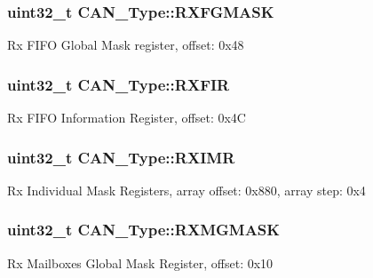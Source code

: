 \subsubsection[{\texorpdfstring{R\+X\+F\+G\+M\+A\+SK}{RXFGMASK}}]{ uint32\+\_\+t C\+A\+N\+\_\+\+Type\+::\+R\+X\+F\+G\+M\+A\+SK}\hypertarget{structCAN__Type_ae6d6dd082b3f74a0ad6bfa9ce2665d54}{}\label{structCAN__Type_ae6d6dd082b3f74a0ad6bfa9ce2665d54}
Rx F\+I\+FO Global Mask register, offset\+: 0x48 
\subsubsection[{\texorpdfstring{R\+X\+F\+IR}{RXFIR}}]{ uint32\+\_\+t C\+A\+N\+\_\+\+Type\+::\+R\+X\+F\+IR}\hypertarget{structCAN__Type_a1c858e981e33bfb31319400705ac3f79}{}\label{structCAN__Type_a1c858e981e33bfb31319400705ac3f79}
Rx F\+I\+FO Information Register, offset\+: 0x4C 
\subsubsection[{\texorpdfstring{R\+X\+I\+MR}{RXIMR}}]{ uint32\+\_\+t C\+A\+N\+\_\+\+Type\+::\+R\+X\+I\+MR}\hypertarget{structCAN__Type_a46886ccf8a567ed0f82b3f960fdcd885}{}\label{structCAN__Type_a46886ccf8a567ed0f82b3f960fdcd885}
Rx Individual Mask Registers, array offset\+: 0x880, array step\+: 0x4 
\subsubsection[{\texorpdfstring{R\+X\+M\+G\+M\+A\+SK}{RXMGMASK}}]{ uint32\+\_\+t C\+A\+N\+\_\+\+Type\+::\+R\+X\+M\+G\+M\+A\+SK}\hypertarget{structCAN__Type_a0bd83d586aff02537abbe1a3680d960f}{}\label{structCAN__Type_a0bd83d586aff02537abbe1a3680d960f}
Rx Mailboxes Global Mask Register, offset\+: 0x10 
